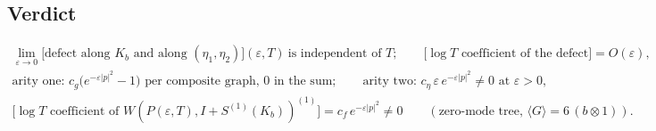 \documentclass[10pt]{article}
\begin{document}
\subsection*{Verdict}
\begin{gather*}
\lim_{\varepsilon\to0}\big[\text{defect along }K_b\text{ and along }(\eta_1,\eta_2)\big](\varepsilon,T)\ \text{is independent of }T;\qquad
\big[\log T\text{ coefficient of the defect}\big]=O(\varepsilon),\\
\text{arity one: }c_g\big(e^{-\varepsilon|p|^2}-1\big)\text{ per composite graph, }0\text{ in the sum};\qquad
\text{arity two: }c_\eta\,\varepsilon\,e^{-\varepsilon|p|^2}\neq0\text{ at }\varepsilon>0,\\
\big[\log T\text{ coefficient of }W(P(\varepsilon,T),I+S^{(1)}(K_b))^{(1)}\big]=c_f\,e^{-\varepsilon|p|^2}\neq0\qquad(\text{zero-mode tree, }\langle G\rangle=6\,(b\otimes1)).
\end{gather*}
\end{document}
